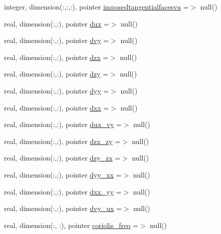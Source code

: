 \begin{DoxyCompactItemize}
integer, dimension(\+:,\+:,\+:), pointer \mbox{\hyperlink{structmodulehydrodynamic_1_1t__external_a740c591199ad001750f6ad29b27feab0}{imposedtangentialfacesvu}} =$>$ null()
\item 
real, dimension(\+:,\+:), pointer \mbox{\hyperlink{structmodulehydrodynamic_1_1t__external_abc3f7fc66e963e5e326cf8b9ad51158c}{dux}} =$>$ null()
\item 
real, dimension(\+:,\+:), pointer \mbox{\hyperlink{structmodulehydrodynamic_1_1t__external_aef7982d7f3fe71ea05cdc2d75360c5b9}{dvy}} =$>$ null()
\item 
real, dimension(\+:,\+:), pointer \mbox{\hyperlink{structmodulehydrodynamic_1_1t__external_afb423a320d5e71d6fb91257db58e208b}{dzx}} =$>$ null()
\item 
real, dimension(\+:,\+:), pointer \mbox{\hyperlink{structmodulehydrodynamic_1_1t__external_a08395562eaf7703aec1669cd4820ad21}{dzy}} =$>$ null()
\item 
real, dimension(\+:,\+:), pointer \mbox{\hyperlink{structmodulehydrodynamic_1_1t__external_ab741975409dfece5e1939cd026f3cd5a}{dyy}} =$>$ null()
\item 
real, dimension(\+:,\+:), pointer \mbox{\hyperlink{structmodulehydrodynamic_1_1t__external_acdfb3e19e04f25bdbc6a91b5bcee454e}{dxx}} =$>$ null()
\item 
real, dimension(\+:,\+:), pointer \mbox{\hyperlink{structmodulehydrodynamic_1_1t__external_a4a088242c62be7abf8a55c102808e061}{dux\+\_\+vy}} =$>$ null()
\item 
real, dimension(\+:,\+:), pointer \mbox{\hyperlink{structmodulehydrodynamic_1_1t__external_a8291738506e423d56a5f99da0e0cff63}{dzx\+\_\+zy}} =$>$ null()
\item 
real, dimension(\+:,\+:), pointer \mbox{\hyperlink{structmodulehydrodynamic_1_1t__external_a9a6b6d8e7267a6f31c363ba8ef3fd06f}{dzy\+\_\+zx}} =$>$ null()
\item 
real, dimension(\+:,\+:), pointer \mbox{\hyperlink{structmodulehydrodynamic_1_1t__external_a64944dd7ad8a3a9fa4c3c7a07b88b335}{dyy\+\_\+xx}} =$>$ null()
\item 
real, dimension(\+:,\+:), pointer \mbox{\hyperlink{structmodulehydrodynamic_1_1t__external_a163fa6ec2348c0307dec5e328715a116}{dxx\+\_\+yy}} =$>$ null()
\item 
real, dimension(\+:,\+:), pointer \mbox{\hyperlink{structmodulehydrodynamic_1_1t__external_a13dfd336f562c687a75ba2a398c742af}{dvy\+\_\+ux}} =$>$ null()
\item 
real, dimension(\+:, \+:), pointer \mbox{\hyperlink{structmodulehydrodynamic_1_1t__external_af6241cee6d72e5faa8c91c8f2a4cb669}{coriolis\+\_\+freq}} =$>$ null()

\end{DoxyCompactItemize}
